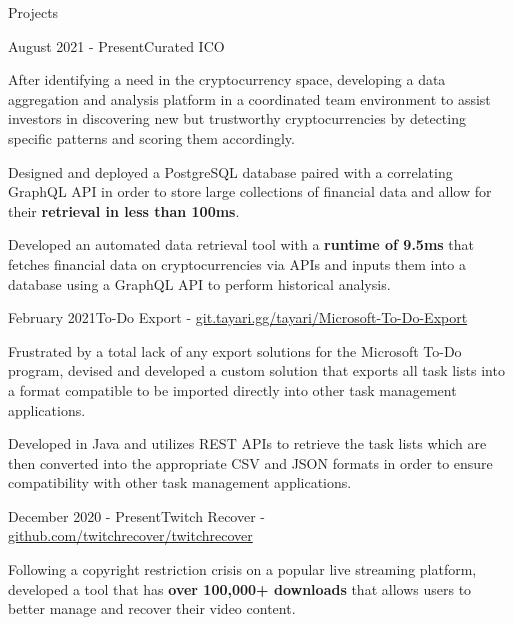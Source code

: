 \documentclass{article}
\newlength{\tabin}
\newlength{\secsep}
\newcommand{\lineunder}{\vspace*{-8pt} \\ \hspace*{-6pt} \hrulefill \\ \vspace*{-15pt}}
\newenvironment{tabbedsection}[1]{
  \begin{list}{}{
      \setlength{\itemsep}{0pt}
      \setlength{\labelsep}{0pt}
      \setlength{\labelwidth}{0pt}
      \setlength{\leftmargin}{0pt}
      \setlength{\rightmargin}{\tabin}
      \setlength{\listparindent}{0pt}
      \setlength{\parsep}{0pt}
      \setlength{\parskip}{0pt}
      \setlength{\partopsep}{0pt}
      \setlength{\topsep}{#1}
    }
  \item[]
}{\end{list}}
\newenvironment{resume_section}[1]{
  \filbreak
  \vspace{2\secsep}
  \textsc{\color{blue}\large#1}
  \lineunder
  \begin{tabbedsection}{\secsep}
}{\end{tabbedsection}}
\newenvironment{resume_subsection}[2]{
  \textbf{\color{BlueViolet}#2} \hfill {\normalsize (#1)} \hspace{-5em}
  \begin{tabbedsection}{0.5\secsep}
  \begin{subitems}
}{\end{subitems}\end{tabbedsection}}
\newenvironment{subitems}{
  \renewcommand{\labelitemi}{-}
  \begin{itemize}
      \setlength{\labelsep}{1em}
}{\end{itemize}}
\begin{document}
\vspace{2\secsep}

\begin{resume_section}{Projects}
    \begin{resume_subsection}{August 2021 - Present}{Curated ICO}
        \item After identifying a need in the cryptocurrency space, developing a data aggregation and analysis platform in a coordinated team environment to assist investors in discovering new but trustworthy cryptocurrencies by detecting specific patterns and scoring them accordingly.
        \item Designed and deployed a PostgreSQL database paired with a correlating GraphQL API in order to store large collections of financial data and allow for their \textbf{retrieval in less than 100ms}.
        \item Developed an automated data retrieval tool with a \textbf{runtime of 9.5ms} that fetches financial data on cryptocurrencies via APIs and inputs them into a database using a GraphQL API to perform historical analysis.
    \end{resume_subsection}
    \vspace{2\secsep}
    \begin{resume_subsection}{February 2021}{To-Do Export - \faGitlab \hspace{0.01cm} \href{https://git.tayari.gg/tayari/Microsoft-To-Do-Export}{git.tayari.gg/tayari/Microsoft-To-Do-Export}}
        \item Frustrated by a total lack of any export solutions for the Microsoft To-Do program, devised and developed a custom solution that exports all task lists into a format compatible to be imported directly into other task management applications.
        \item Developed in Java and utilizes REST APIs to retrieve the task lists which are then converted into the appropriate CSV and JSON formats in order to ensure compatibility with other task management applications.
    \end{resume_subsection}
    \vspace{2\secsep}
    \begin{resume_subsection}{December 2020 - Present}{Twitch Recover - \faGithub \hspace{0.01cm} \href{https://github.com/twitchrecover/twitchrecover}{github.com/twitchrecover/twitchrecover}}
        \item Following a copyright restriction crisis on a popular live streaming platform, developed a tool that has \textbf{over 100,000+ downloads} that allows users to better manage and recover their video content.

\end{resume_subsection}
\end{resume_section}
\end{document}

